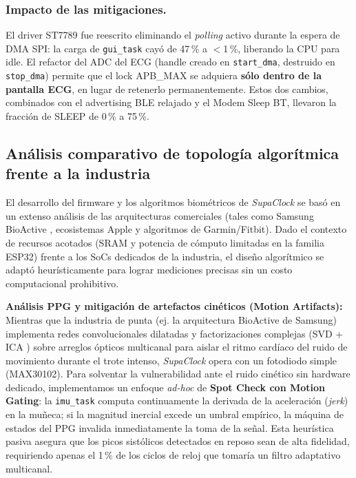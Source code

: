 \documentclass[letterpaper,11pt]{article}
\begin{document}
\subsubsection{Impacto de las mitigaciones.} El driver ST7789 fue reescrito eliminando el
\textit{polling} activo durante la espera de DMA SPI: la carga de \texttt{gui\_task} cayó de
47\,\% a $<$1\,\%, liberando la CPU para idle. El refactor del ADC del ECG (handle creado
en \texttt{start\_dma}, destruido en \texttt{stop\_dma}) permite que el lock APB\_MAX se
adquiera \textbf{sólo dentro de la pantalla ECG}, en lugar de retenerlo permanentemente.
Estos dos cambios, combinados con el advertising BLE relajado y el Modem Sleep BT, llevaron
la fracción de SLEEP de 0\,\% a 75\,\%.

\subsection{Análisis comparativo de topología algorítmica frente a la industria}
El desarrollo del firmware y los algoritmos biométricos de \textit{SupaClock} se basó en un extenso análisis de las arquitecturas comerciales (tales como Samsung BioActive \cite{samsung_bioactive}, ecosistemas Apple y algoritmos de Garmin/Fitbit). Dado el contexto de recursos acotados (SRAM y potencia de cómputo limitadas en la familia ESP32) frente a los SoCs dedicados de la industria, el diseño algorítmico se adaptó heurísticamente para lograr mediciones precisas sin un costo computacional prohibitivo.

\textbf{Análisis PPG y mitigación de artefactos cinéticos (Motion Artifacts):}
Mientras que la industria de punta (ej. la arquitectura BioActive de Samsung) implementa redes convolucionales dilatadas \cite{kazemi_cnn} y factorizaciones complejas (SVD + ICA \cite{motion_artifact_svd}) sobre arreglos ópticos multicanal para aislar el ritmo cardíaco del ruido de movimiento durante el trote intenso, \textit{SupaClock} opera con un fotodiodo simple (MAX30102). Para solventar la vulnerabilidad ante el ruido cinético sin hardware dedicado, implementamos un enfoque \textit{ad-hoc} de \textbf{Spot Check con Motion Gating}: la \texttt{imu\_task} computa continuamente la derivada de la aceleración (\textit{jerk}) en la muñeca; si la magnitud inercial excede un umbral empírico, la máquina de estados del PPG invalida inmediatamente la toma de la señal. Esta heurística pasiva asegura que los picos sistólicos detectados en reposo sean de alta fidelidad, requiriendo apenas el 1\,\% de los ciclos de reloj que tomaría un filtro adaptativo multicanal.
\end{document}
